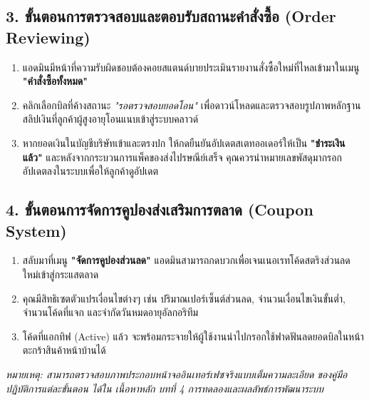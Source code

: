 \subsection{3. ขั้นตอนการตรวจสอบและตอบรับสถานะคำสั่งซื้อ (Order Reviewing)}
\begin{enumerate}
    \item แอดมินมีหน้าที่ความรับผิดชอบต้องคอยสแตนด์บายประเมินรายงานสั่งซื้อใหม่ที่ไหลเข้ามาในเมนู \textbf{"คำสั่งซื้อทั้งหมด"}
    \item คลิกเลือกบิลที่ค้างสถานะ \textit{"รอตรวจสอบยอดโอน"} เพื่อดาวน์โหลดและตรวจสอบรูปภาพหลักฐานสลิปเงินที่ลูกค้าผู้สูงอายุโอนแนบเข้าสู่ระบบคลาวด์
    \item หากยอดเงินในบัญชีบริษัทเข้าและตรงปก ให้กดยืนยันอัปเดตสเตทออเดอร์ให้เป็น \textbf{"ชำระเงินแล้ว"} และหลังจากกระบวนการแพ็คของส่งไปรษณีย์เสร็จ คุณควรนำหมายเลขพัสดุมากรอกอัปเดตลงในระบบเพื่อให้ลูกค้าดูอัปเดต 
\end{enumerate}

\subsection{4. ขั้นตอนการจัดการคูปองส่งเสริมการตลาด (Coupon System)}
\begin{enumerate}
    \item สลับมาที่เมนู \textbf{"จัดการคูปองส่วนลด"} แอดมินสามารถกดบวกเพื่อเจนเนอเรทโค้ดสตริงส่วนลดใหม่เข้าสู่กระแสตลาด
    \item คุณมีสิทธิเซตตัวแปรเงื่อนไขต่างๆ เช่น ปริมาณเปอร์เซ็นต์ส่วนลด, จำนวนเงื่อนไขเงินขั้นต่ำ, จำนวนโค้ดที่แจก และจำกัดวันหมดอายุอัลกอริทึม
    \item โค้ดที่แอกทิฟ (Active) แล้ว จะพร้อมกระจายให้ผู้ใช้งานนำไปกรอกใช้ฟาดฟันลดยอดบิลในหน้าตะกร้าสินค้าหน้าบ้านได้ 
\end{enumerate}

\vspace{1.5cm}
\begin{center}
    \textit{หมายเหตุ: สามารถตรวจสอบภาพประกอบหน้าจออินเทอร์เฟซจริงแบบเต็มความละเอียด ของคู่มือปฏิบัติการแต่ละขั้นตอน ได้ใน เนื้อหาหลัก บทที่ 4 การทดลองและผลลัพธ์การพัฒนาระบบ}
\end{center}
